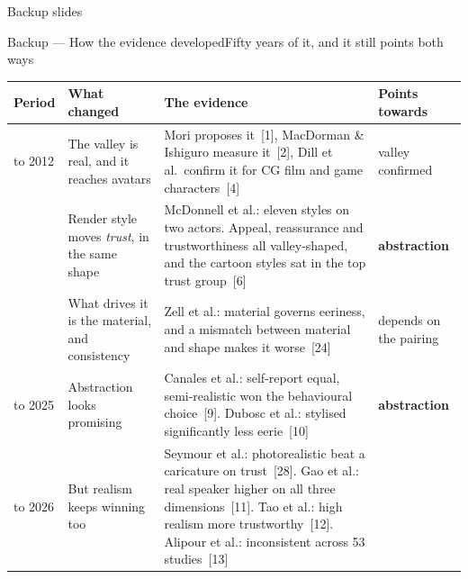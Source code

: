 \documentclass[aspectratio=169,10pt]{beamer}
\newcommand{\hl}[1]{{\color{knblue}\textbf{#1}}}
\begin{document}

\begin{frame}[plain]
  \vspace{3.0em}
  \begin{center}
    {\Large\color{kngrey} Backup slides}
  \end{center}
\end{frame}

\begin{frame}{Backup — How the evidence developed}{Fifty years of it, and it still points both ways}
  \vspace{0.3em}
  \begin{center}
  \scriptsize
  \setlength{\tabcolsep}{5pt}\renewcommand{\arraystretch}{1.12}
  \begin{tabular}{@{}>{\raggedright\arraybackslash}p{}>{\raggedright\arraybackslash}p{}>{\raggedright\arraybackslash}p{}>{\raggedright\arraybackslash}p{}@{}}
    \toprule
    \textbf{Period} & \textbf{What changed} & \textbf{The evidence} & \textbf{Points towards} \\
    \midrule
    1970\newline to 2012 & The valley is real, and it reaches avatars
      & Mori proposes it~[1], MacDorman \& Ishiguro measure it~[2], Dill et al.\ confirm it for CG film and game characters~[4]
      & {\color{kngrey}valley confirmed} \\
    2012 & Render style moves \emph{trust}, in the same shape
      & McDonnell et al.: eleven styles on two actors. Appeal, reassurance and trustworthiness all valley-shaped, and the cartoon styles sat in the top trust group~[6]
      & \hl{abstraction} \\
    2015 & What drives it is the material, and consistency
      & Zell et al.: material governs eeriness, and a mismatch between material and shape makes it worse~[24]
      & {\color{kngrey}depends on the pairing} \\
    2024\newline to 2025 & Abstraction looks promising
      & Canales et al.: self-report equal, semi-realistic won the behavioural choice~[9]. Dubosc et al.: stylised significantly less eerie~[10]
      & \hl{abstraction} \\
    2021\newline to 2026 & But realism keeps winning too
      & Seymour et al.: photorealistic beat a caricature on trust~[28]. Gao et al.: real speaker higher on all three dimensions~[11]. Tao et al.: high realism more trustworthy~[12]. Alipour et al.: inconsistent across 53 studies~[13]

\end{tabular}
\end{center}
\end{frame}
\end{document}
